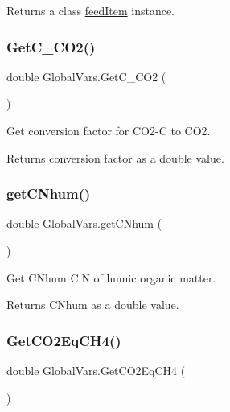 \begin{DoxyReturn}{Returns}
a class \mbox{\hyperlink{classfeed_item}{feed\+Item}} instance. 
\end{DoxyReturn}
\mbox{\label{class_global_vars_a3395cb56ec72d5e9257d67860d7c29c8}} 
\subsubsection{\texorpdfstring{GetC\_CO2()}{GetC\_CO2()}}
{\footnotesize\ttfamily double Global\+Vars.\+Get\+C\+\_\+\+C\+O2 (\begin{DoxyParamCaption}{ }\end{DoxyParamCaption})\hspace{0.3cm}{\ttfamily [inline]}}



Get conversion factor for C\+O2-\/C to C\+O2. 

\begin{DoxyReturn}{Returns}
conversion factor as a double value. 
\end{DoxyReturn}
\mbox{\label{class_global_vars_ae3c99a4d8f250b66225cc04944f5cbf9}} 
\subsubsection{\texorpdfstring{getCNhum()}{getCNhum()}}
{\footnotesize\ttfamily double Global\+Vars.\+get\+C\+Nhum (\begin{DoxyParamCaption}{ }\end{DoxyParamCaption})\hspace{0.3cm}{\ttfamily [inline]}}



Get C\+Nhum C\+:N of humic organic matter. 

\begin{DoxyReturn}{Returns}
C\+Nhum as a double value. 
\end{DoxyReturn}
\mbox{\label{class_global_vars_ac7ae0cf95fa3e649fac5769867ec1de0}} 
\subsubsection{\texorpdfstring{GetCO2EqCH4()}{GetCO2EqCH4()}}
{\footnotesize\ttfamily double Global\+Vars.\+Get\+C\+O2\+Eq\+C\+H4 (\begin{DoxyParamCaption}{ }\end{DoxyParamCaption})\hspace{0.3cm}{\ttfamily [inline]}}




